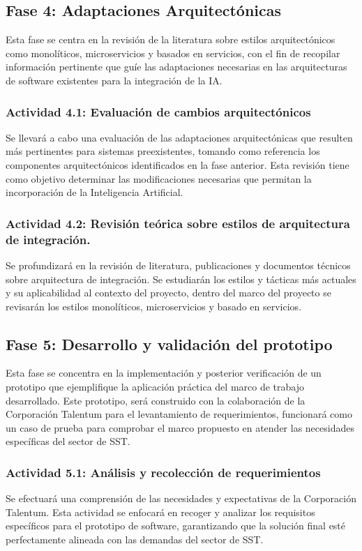 \subsection{Fase 4: Adaptaciones Arquitectónicas}
Esta fase se centra en la revisión de la literatura sobre estilos arquitectónicos como monolíticos, microservicios y basados en servicios, con el fin de recopilar información pertinente que guíe las adaptaciones necesarias en las arquitecturas de software existentes para la integración de la IA.

\subsubsection{Actividad 4.1: Evaluación de cambios arquitectónicos}
Se llevará a cabo una evaluación de las adaptaciones arquitectónicas que resulten más pertinentes para sistemas preexistentes, tomando como referencia los componentes arquitectónicos identificados en la fase anterior. Esta revisión tiene como objetivo determinar las modificaciones necesarias que permitan la incorporación de la Inteligencia Artificial.

\subsubsection{Actividad 4.2: Revisión teórica sobre estilos de arquitectura de integración.}
Se profundizará en la revisión de literatura, publicaciones y documentos técnicos sobre arquitectura de integración. Se estudiarán los estilos y tácticas más actuales y su aplicabilidad al contexto del proyecto, dentro del marco del proyecto se revisarán los estilos monolíticos, microservicios y basado en servicios.





\subsection{Fase 5: Desarrollo y validación del prototipo}
Esta fase se concentra en la implementación y posterior verificación de un prototipo que ejemplifique la aplicación práctica del marco de trabajo desarrollado. Este prototipo, será construido con la colaboración de la Corporación Talentum para el levantamiento de requerimientos, funcionará como un caso de prueba para comprobar el marco propuesto en atender las necesidades específicas del sector de SST.

\subsubsection{Actividad 5.1: Análisis y recolección de requerimientos}
Se efectuará una comprensión de las necesidades y expectativas de la Corporación Talentum. Esta actividad se enfocará en recoger y analizar los requisitos específicos para el prototipo de software, garantizando que la solución final esté perfectamente alineada con las demandas del sector de SST.

